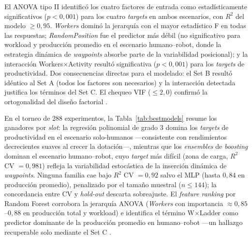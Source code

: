 \documentclass[conference]{IEEEtran}
\begin{document}
El ANOVA tipo II identificó los cuatro factores de entrada como estadísticamente significativos ($p<0{,}001$) para los cuatro \textit{targets} en ambos escenarios, con $R^2$ del modelo $\geq 0{,}95$. \textit{Workers} dominó la jerarquía con el mayor estadístico F en todas las respuestas; \textit{RandomPosition} fue el predictor más débil (no significativo para workload y producción promedio en el escenario humano--robot, donde la estrategia dinámica de \textit{waypoints} absorbe parte de la variabilidad posicional); y la interacción Workers$\times$Activity resultó significativa ($p<0{,}001$) para los \textit{targets} de productividad. Dos consecuencias directas para el modelado: el Set B resultó idéntico al Set A (todos los factores son necesarios) y la interacción detectada justifica los términos del Set C. El chequeo VIF ($\leq 2{,}0$) confirmó la ortogonalidad del diseño factorial \cite{garcia2026}.

En el torneo de 288 experimentos, la Tabla~\ref{tab:bestmodels} resume los ganadores por \textit{slot}: la regresión polinomial de grado 3 domina los \textit{targets} de productividad en el escenario solo-humanos —consistente con rendimientos decrecientes suaves al crecer la dotación—, mientras que los \textit{ensembles} de \textit{boosting} dominan el escenario humano--robot, cuyo \textit{target} más difícil (zona de carga, $R^2$ CV $= 0{,}981$) refleja la variabilidad estocástica de la inserción dinámica de \textit{waypoints}. Ninguna familia cae bajo $R^2$ CV $= 0{,}92$ salvo el MLP (hasta $0{,}84$ en producción promedio), penalizado por el tamaño muestral ($n \leq 144$); la concordancia entre CV y \textit{hold-out} descarta sobreajuste. El \textit{feature ranking} por Random Forest corrobora la jerarquía ANOVA (\textit{Workers} con importancia $\approx 0{,}85$--$0{,}88$ en producción total y workload) e identifica el término W$\times$Ladder como predictor dominante de la producción promedio en humano--robot —un hallazgo recuperable solo mediante el Set C \cite{garcia2026}.
\end{document}

